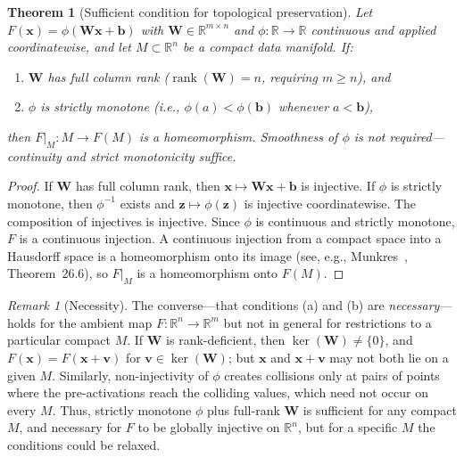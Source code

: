 \documentclass[11pt,a4paper]{article}
\newtheorem{theorem}{Theorem}
\theoremstyle{remark}
\newtheorem{remark}{Remark}
\begin{document}
\begin{theorem}[Sufficient condition for topological preservation]
\label{thm:topology}
Let $F(\mathbf{x}) = \phi(\mathbf{W}\mathbf{x} + \mathbf{b})$ with $\mathbf{W} \in \mathbb{R}^{m \times n}$ and $\phi: \mathbb{R} \to \mathbb{R}$ continuous and applied coordinatewise, and let $M \subset \mathbb{R}^n$ be a compact data manifold.
If:
\begin{enumerate}[label=(\alph*)]
  \item $\mathbf{W}$ has full column rank ($\operatorname{rank}(\mathbf{W}) = n$, requiring $m \geq n$), and
  \item $\phi$ is \emph{strictly monotone} (i.e., $\phi(a) < \phi(\mathbf{b})$ whenever $a < \mathbf{b}$),
\end{enumerate}
then $F|_M: M \to F(M)$ is a homeomorphism.
Smoothness of $\phi$ is \emph{not} required---continuity and strict monotonicity suffice.
\end{theorem}

\begin{proof}
If $\mathbf{W}$ has full column rank, then $\mathbf{x} \mapsto \mathbf{W}\mathbf{x} + \mathbf{b}$ is injective.  If $\phi$ is strictly monotone, then $\phi^{-1}$ exists and $\mathbf{z} \mapsto \phi(\mathbf{z})$ is injective coordinatewise.  The composition of injectives is injective.  Since $\phi$ is continuous and strictly monotone, $F$ is a continuous injection.  A continuous injection from a compact space into a Hausdorff space is a homeomorphism onto its image (see, e.g., Munkres~\cite{munkres2000topology}, Theorem~26.6), so $F|_M$ is a homeomorphism onto $F(M)$.
\end{proof}

\begin{remark}[Necessity]
\label{rem:necessity}
The converse---that conditions (a) and (b) are \emph{necessary}---holds for the ambient map $F: \mathbb{R}^n \to \mathbb{R}^m$ but not in general for restrictions to a particular compact $M$.
If $\mathbf{W}$ is rank-deficient, then $\ker(\mathbf{W}) \neq \{0\}$, and $F(\mathbf{x}) = F(\mathbf{x}+\mathbf{v})$ for $\mathbf{v} \in \ker(\mathbf{W})$; but $\mathbf{x}$ and $\mathbf{x} + \mathbf{v}$ may not both lie on a given $M$.
Similarly, non-injectivity of $\phi$ creates collisions only at pairs of points where the pre-activations reach the colliding values, which need not occur on every $M$.
Thus, strictly monotone $\phi$ plus full-rank $\mathbf{W}$ is sufficient for any compact $M$, and necessary for $F$ to be globally injective on $\mathbb{R}^n$, but for a specific $M$ the conditions could be relaxed.
\end{remark}
\end{document}
